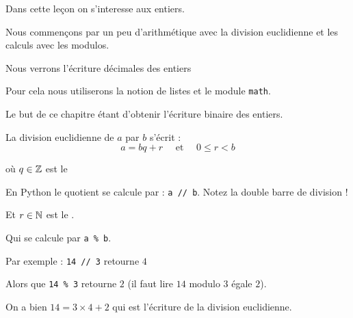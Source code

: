 


\newcommand{\codeinline}[1]{\texttt{#1}}





\debuttexte

\diapo

\change

Dans cette leçon on s'interesse aux entiers.

\change

Nous commençons par un peu d'arithmétique avec la division euclidienne et les calculs avec les modulos.

\change

Nous verrons l'écriture décimales des entiers 

\change

Pour cela nous utiliserons la notion de listes et le module \codeinline{math}.

\change

Le but de ce chapitre étant d'obtenir l'écriture binaire des entiers.

\diapo

La division euclidienne de $a$ par $b$ s'écrit :
$$a = bq+r \quad \text{ et } \quad 0 \le r < b$$

\change

où $q \in \mathbb{Z}$ est le  

\change

En Python le quotient se calcule par : \codeinline{a // b}. Notez la double barre de division !

\change

Et $r \in \mathbb{N}$ est le .

\change

Qui se calcule par \codeinline{a \% b}.

\change

Par exemple : \codeinline{14 // 3} retourne $4$

\change

Alors que \codeinline{14 \% 3}  retourne $2$ (il faut lire $14$ modulo $3$ égale $2$).

\change

On a bien $14 = 3 \times 4 + 2$ qui est l'écriture de la division euclidienne.

